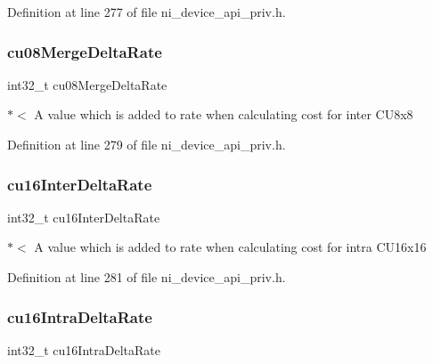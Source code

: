 Definition at line 277 of file ni\+\_\+device\+\_\+api\+\_\+priv.\+h.

\mbox{\label{struct__ni__t408__config__t_a2a32547e59bbd660fda362ec631813dc}} 
\subsubsection{\texorpdfstring{cu08MergeDeltaRate}{cu08MergeDeltaRate}}
{\footnotesize\ttfamily int32\+\_\+t cu08\+Merge\+Delta\+Rate}

$\ast$$<$ A value which is added to rate when calculating cost for inter C\+U8x8 

Definition at line 279 of file ni\+\_\+device\+\_\+api\+\_\+priv.\+h.

\mbox{\label{struct__ni__t408__config__t_a160aa52131cb8c9369f6ae69c4863331}} 
\subsubsection{\texorpdfstring{cu16InterDeltaRate}{cu16InterDeltaRate}}
{\footnotesize\ttfamily int32\+\_\+t cu16\+Inter\+Delta\+Rate}

$\ast$$<$ A value which is added to rate when calculating cost for intra C\+U16x16 

Definition at line 281 of file ni\+\_\+device\+\_\+api\+\_\+priv.\+h.

\mbox{\label{struct__ni__t408__config__t_ad199ac0711218333065351a03d5680c5}} 
\subsubsection{\texorpdfstring{cu16IntraDeltaRate}{cu16IntraDeltaRate}}
{\footnotesize\ttfamily int32\+\_\+t cu16\+Intra\+Delta\+Rate}

